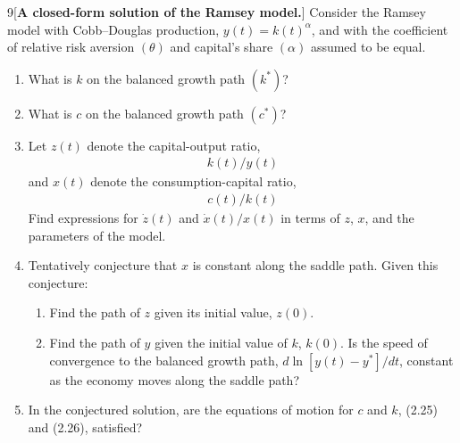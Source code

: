 \begin{problem}{9}[\textbf{A closed-form solution of the Ramsey model.}]
Consider the Ramsey model with Cobb--Douglas production, \(y\left(t\right)=k\left(t\right)^{\alpha}\), and with the coefficient of relative risk aversion \(\left(\theta\right)\) and capital's share \(\left(\alpha\right)\) assumed to be equal.
\begin{enumerate}[label=(\alph*)]
    \item What is \(k\) on the balanced growth path \(\left(k^*\right)\)?
    \item What is \(c\) on the balanced growth path \(\left(c^*\right)\)?
    \item Let \(z\left(t\right)\) denote the capital-output ratio,
    \begin{align*}
    k\left(t\right)/y\left(t\right)
    \end{align*}
    and \(x\left(t\right)\) denote the consumption-capital ratio,
    \begin{align*}
    c\left(t\right)/k\left(t\right)
    \end{align*}
    Find expressions for \(\dot{z}\left(t\right)\) and \(\dot{x}\left(t\right)/x\left(t\right)\) in terms of \(z\), \(x\), and the parameters of the model.
    \item Tentatively conjecture that \(x\) is constant along the saddle path. Given this conjecture:
    \begin{enumerate}[label=(\roman*)]
        \item Find the path of \(z\) given its initial value, \(z\left(0\right)\).
        \item Find the path of \(y\) given the initial value of \(k\), \(k\left(0\right)\). Is the speed of convergence to the balanced growth path, \(d\ln\left[y\left(t\right)-y^*\right]/dt\), constant as the economy moves along the saddle path?
    \end{enumerate}
    \item In the conjectured solution, are the equations of motion for \(c\) and \(k\), (2.25) and (2.26), satisfied?
\end{enumerate}
\end{problem}

